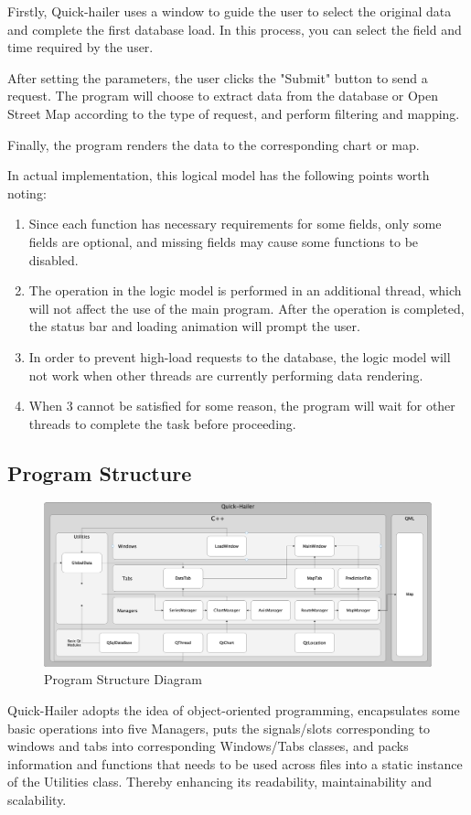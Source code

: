 \documentclass{article}
\begin{document}
Firstly, Quick-hailer uses a window to guide the user to select the original data and complete the first database load. In this process, you can select the field and time required by the user.

After setting the parameters, the user clicks the "Submit" button to send a request. The program will choose to extract data from the database or Open Street Map according to the type of request, and perform filtering and mapping.

Finally, the program renders the data to the corresponding chart or map.

In actual implementation, this logical model has the following points worth noting:
\begin{enumerate}
	\item Since each function has necessary requirements for some fields, only some fields are optional, and missing fields may cause some functions to be disabled.
	\item The operation in the logic model is performed in an additional thread, which will not affect the use of the main program. After the operation is completed, the status bar and loading animation will prompt the user.
	\item In order to prevent high-load requests to the database, the logic model will not work when other threads are currently performing data rendering.
	\item When 3 cannot be satisfied for some reason, the program will wait for other threads to complete the task before proceeding.
\end{enumerate}

\subsection{Program Structure}
\setlength{\parindent}{0em}
\begin{figure}[htbp] 
	\centering 
	\includegraphics[scale=0.14]{ProgramStructure.png}
	\caption{Program Structure Diagram}
\end{figure}
\setlength{\parindent}{2em}
Quick-Hailer adopts the idea of ​​object-oriented programming, encapsulates some basic operations into five Managers, puts the signals/slots corresponding to windows and tabs into corresponding Windows/Tabs classes, and packs information and functions that needs to be used across files into a static instance of the Utilities class. Thereby enhancing its readability, maintainability and scalability.
\end{document}
